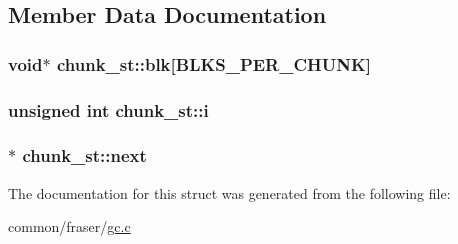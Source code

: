 \subsection{Member Data Documentation}
\hypertarget{structchunk__st_ae095021656a922df53d27b5489abbab0}{
\subsubsection[{blk}]{\setlength{\rightskip}{0pt plus 5cm}void$\ast$ chunk\-\_\-st\-::blk\mbox{[}{\bf B\-L\-K\-S\-\_\-\-P\-E\-R\-\_\-\-C\-H\-U\-N\-K}\mbox{]}}}\label{structchunk__st_ae095021656a922df53d27b5489abbab0}
\hypertarget{structchunk__st_a0b638207fcd12ccf21ca190ad2841ef8}{
\subsubsection[{i}]{\setlength{\rightskip}{0pt plus 5cm}unsigned int chunk\-\_\-st\-::i}}\label{structchunk__st_a0b638207fcd12ccf21ca190ad2841ef8}
\hypertarget{structchunk__st_ae5c359b00750ef57e36e5c7ac370074b}{
\subsubsection[{next}]{$\ast$ chunk\-\_\-st\-::next}}\label{structchunk__st_ae5c359b00750ef57e36e5c7ac370074b}


The documentation for this struct was generated from the following file\-:\begin{DoxyCompactItemize}
\item 
common/fraser/\hyperlink{gc_8c}{gc.\-c}\end{DoxyCompactItemize}
